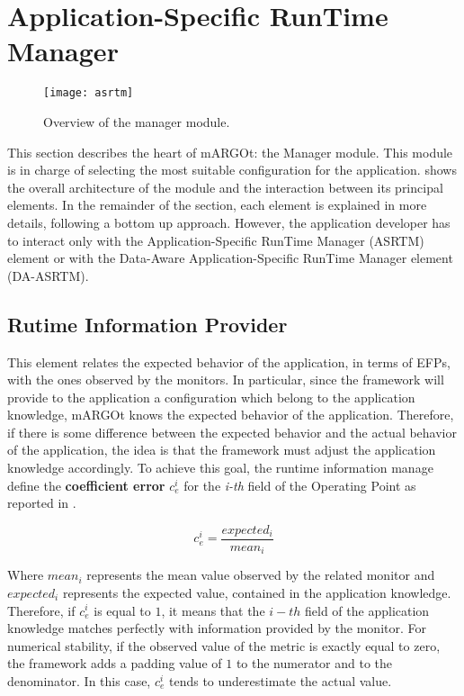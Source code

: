 \section{Application-Specific RunTime Manager}


\begin{figure}
	\centering
	\texttt{[image: asrtm]}
	\caption{Overview of the manager module. }
	\label{fig:asrtm_module}
\end{figure}


This section describes the heart of mARGOt: the Manager module.
This module is in charge of selecting the most suitable configuration for the application.
 shows the overall architecture of the module and the interaction between its principal elements.
In the remainder of the section, each element is explained in more details, following a bottom up approach.
However, the application developer has to interact only with the Application-Specific RunTime Manager (ASRTM) element or with the Data-Aware Application-Specific RunTime Manager element (DA-ASRTM).


\subsection{Rutime Information Provider}

This element relates the expected behavior of the application, in terms of EFPs, with the ones observed by the monitors.
In particular, since the framework will provide to the application a configuration which belong to the application knowledge, mARGOt knows the expected behavior of the application.
Therefore, if there is some difference between the expected behavior and the actual behavior of the application, the idea is that the framework must adjust the application knowledge accordingly.
To achieve this goal, the runtime information manage define the \textbf{coefficient error} $c_{e}^{i}$ for the \textit{i-th} field of the Operating Point as reported in .

\begin{equation}
\label{eq:coefficient_error}
c_{e}^{i}=\dfrac{expected_{i}}{mean_{i}}
\end{equation}

Where $mean_{i}$ represents the mean value observed by the related monitor and $expected_{i}$ represents the expected value, contained in the application knowledge.
Therefore, if $c_{e}^{i}$ is equal to $1$, it means that the $i-th$ field of the application knowledge matches perfectly with information provided by the monitor.
For numerical stability, if the observed value of the metric is exactly equal to zero, the framework adds a padding value of $1$ to the numerator and to the denominator.
In this case, $c_{e}^{i}$ tends to underestimate the actual value.

